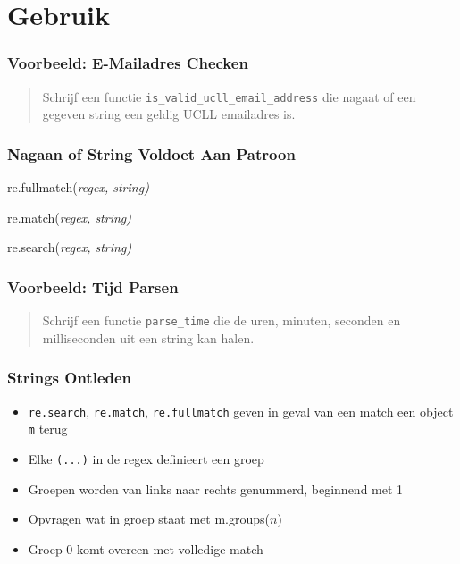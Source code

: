 \section{Gebruik}

\frame{\tableofcontents[currentsection]}

\begin{frame}
  \frametitle{Voorbeeld: E-Mailadres Checken}
  \begin{quote}
    Schrijf een functie \texttt{is\_valid\_ucll\_email\_address}
    die nagaat of een gegeven string een geldig UCLL emailadres is.
  \end{quote}
\end{frame}

\begin{frame}
  \frametitle{Nagaan of String Voldoet Aan Patroon}
  \begin{center} \ttfamily
    re.fullmatch(\itshape{regex}, \itshape{string})
  \end{center}
  \vskip5mm
  \begin{center} \ttfamily
    re.match(\itshape{regex}, \itshape{string})
  \end{center}
  \vskip5mm
  \begin{center} \ttfamily
    re.search(\itshape{regex}, \itshape{string})
  \end{center}
\end{frame}

\begin{frame}
  \frametitle{Voorbeeld: Tijd Parsen}
  \begin{quote}
    Schrijf een functie \texttt{parse\_time} die
    de uren, minuten, seconden en milliseconden uit
    een string kan halen.
  \end{quote}
\end{frame}

\begin{frame}
  \frametitle{Strings Ontleden}
  \begin{itemize}
    \item \texttt{re.search}, \texttt{re.match}, \texttt{re.fullmatch} geven in geval van een match een object \texttt{m} terug
    \item Elke \texttt{(...)} in de regex definieert een groep
    \item Groepen worden van links naar rechts genummerd, beginnend met 1
    \item Opvragen wat in groep staat met {\ttfamily m.groups($n$)}
    \item Groep 0 komt overeen met volledige match
  \end{itemize}
\end{frame}


